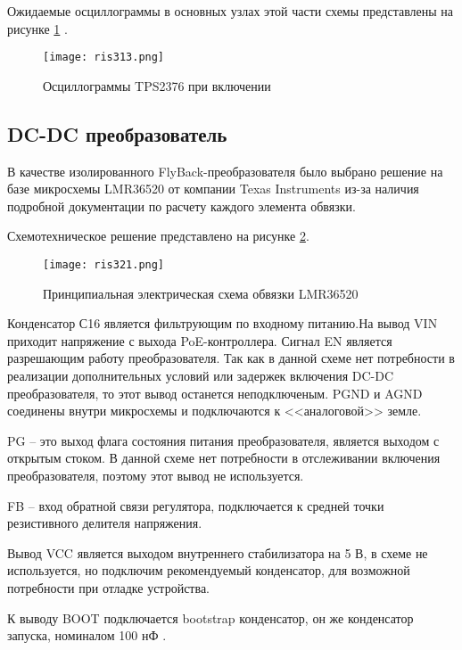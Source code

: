 Ожидаемые осциллограммы в основных узлах этой части схемы представлены на рисунке 
\ref{ris:313} \cite{TPS2376:datasheet}.

\begin{figure}[H]
    \centering
    \texttt{[image: ris313.png]}
    \caption{Осциллограммы TPS2376 при включении}
    \label{ris:313}
\end{figure}

\subsection{DC-DC преобразователь}
\hspace{1cm} 

В качестве изолированного FlyBack-преобразователя было выбрано решение на базе микросхемы LMR36520 
от компании Texas Instruments из-за наличия подробной документации по расчету каждого элемента
обвязки. 

Схемотехническое решение представлено на рисунке \ref{ris:321}.

\begin{figure}[H]
    \centering
    \texttt{[image: ris321.png]}
    \caption{Принципиальная электрическая схема обвязки LMR36520}
    \label{ris:321}
\end{figure}

Конденсатор С16 является фильтрующим по входному питанию.На вывод VIN приходит напряжение
с выхода PoE-контроллера. Сигнал EN является разрешающим работу преобразователя. Так как
в данной схеме нет потребности в реализации дополнительных условий или задержек включения
DC-DC преобразователя, то этот вывод останется неподключеным. PGND и AGND соединены внутри 
микросхемы и подключаются к <<аналоговой>> земле. 

PG -- это выход флага состояния питания преобразователя, является выходом с открытым стоком. 
В данной схеме нет потребности в отслеживании включения преобразователя, поэтому этот вывод не 
используется. 

FB -- вход обратной связи регулятора, подключается к средней точки резистивного делителя
напряжения.

Вывод VCC является выходом внутреннего стабилизатора на 5 В, в схеме не используется, но подключим
рекомендуемый конденсатор, для возможной потребности при отладке устройства.

К выводу BOOT подключается bootstrap конденсатор, он же конденсатор запуска, номиналом 100 нФ 
\cite{LMR36520:datasheet}. 

